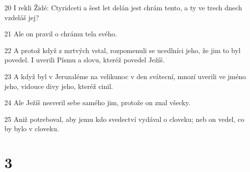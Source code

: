 \par 20 I rekli Židé: Ctyridceti a šest let delán jest chrám tento, a ty ve trech dnech vzdeláš jej?
\par 21 Ale on pravil o chrámu tela svého.
\par 22 A protož když z mrtvých vstal, rozpomenuli se ucedlníci jeho, že jim to byl povedel. I uverili Písmu a slovu, kteréž povedel Ježíš.
\par 23 A když byl v Jeruzaléme na velikunoc v den svátecní, mnozí uverili ve jméno jeho, vidouce divy jeho, kteréž cinil.
\par 24 Ale Ježíš nesveril sebe samého jim, protože on znal všecky.
\par 25 Aniž potreboval, aby jemu kdo svedectví vydával o cloveku; neb on vedel, co by bylo v cloveku.

\chapter{3}

